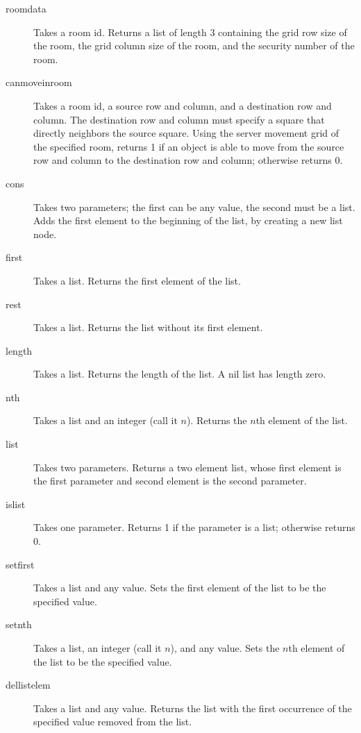 \begin{description}
\item[roomdata] Takes a room id.  Returns a list of length 3 containing the 
grid row size of the room, the grid column size of the room, and the security
number of the room.

\item[canmoveinroom] Takes a room id, a source row and column, and a destination
row and column.  The destination row and column must specify a square that directly
neighbors the source square.  Using the server movement grid of the specified room,
returns 1 if an object is able to move from the source row and column to the destination
row and column; otherwise returns 0.

\item[cons] Takes two parameters; the first can be any value, the second must be a 
list.  Adds the first element to the beginning of the list, by creating a new list
node.

\item[first] Takes a list.  Returns the first element of the list.

\item[rest] Takes a list.  Returns the list without its first element.

\item[length] Takes a list.  Returns the length of the list.  A nil list has
length zero.

\item[nth] Takes a list and an integer (call it $n$).  Returns the $n$th element
of the list.

\item[list] Takes two parameters.  Returns a two element list, whose first element
is the first parameter and second element is the second parameter.

\item[islist] Takes one parameter.  Returns 1 if the parameter is a list; otherwise
returns 0.

\item[setfirst] Takes a list and any value.  Sets the first element of the list
to be the specified value.

\item[setnth] Takes a list, an integer (call it $n$), and any value.  Sets the
$n$th element of the list to be the specified value.

\item[dellistelem] Takes a list and any value.  Returns the list with the first
occurrence of the specified value removed from the list.


\end{description}
